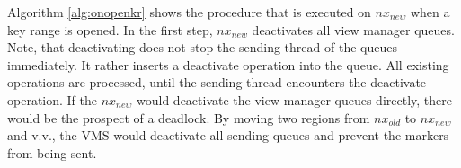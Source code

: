 Algorithm \ref{alg:onopenkr} shows the procedure that is executed on 
$nx_{new}$ when a key range is opened. In the first step, $nx_{new}$ 
deactivates all view manager queues. Note, that deactivating does not 
stop the sending thread of the queues immediately. It rather inserts a 
deactivate operation into the queue. All existing operations are 
processed, until the sending thread encounters the deactivate operation. 
If the $nx_{new}$ would deactivate the view manager queues directly, 
there would be the prospect of a deadlock. By moving two regions from 
$nx_{old}$ to $nx_{new}$ and v.v., the VMS would deactivate all sending 
queues and prevent the markers from being sent. 


